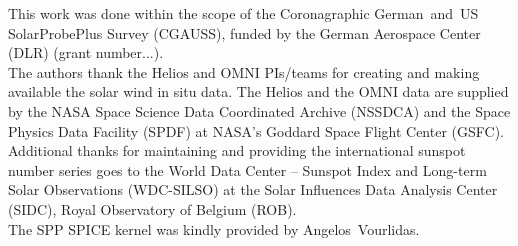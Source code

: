 \begin{acknowledgements}
	This work was done within the scope of the Coronagraphic German~and~US SolarProbePlus Survey (CGAUSS), funded by the German Aerospace Center (DLR) (grant number...).\\
	The authors thank the Helios and OMNI PIs/teams for creating and making available the solar wind in situ data. The Helios and the OMNI data are supplied by the NASA Space Science Data Coordinated Archive (NSSDCA) and the Space Physics Data Facility (SPDF) at NASA's Goddard Space Flight Center (GSFC).\\
	Additional thanks for maintaining and providing the international sunspot number series goes to the World Data Center -- Sunspot Index and Long-term Solar Observations (WDC-SILSO) at the Solar Influences Data Analysis Center (SIDC), Royal Observatory of Belgium (ROB).\\
	The SPP SPICE kernel was kindly provided by Angelos~Vourlidas.\\

\end{acknowledgements}
